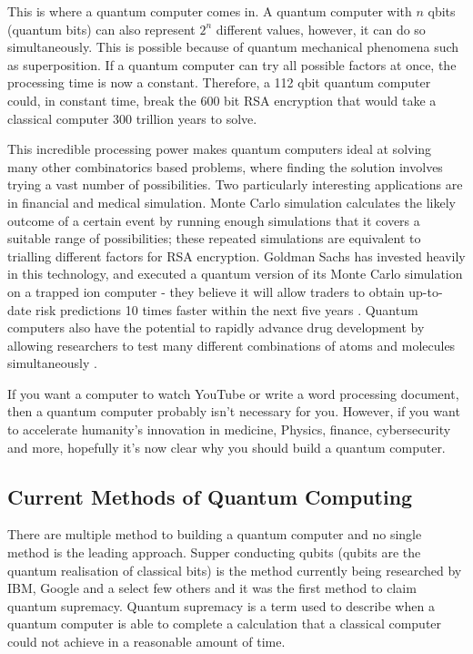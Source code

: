 This is where a quantum computer comes in. A quantum computer with $n$ qbits (quantum bits) can also represent $2^n$ different values, however, it can do so simultaneously. This is possible because of quantum mechanical phenomena such as superposition. If a quantum computer can try all possible factors at once, the processing time is now a constant. Therefore, a 112 qbit quantum computer could, in constant time, break the 600 bit RSA encryption that would take a classical computer 300 trillion years to solve.

This incredible processing power makes quantum computers ideal at solving many other combinatorics based problems, where finding the solution involves trying a vast number of possibilities. Two particularly interesting applications are in financial and medical simulation. Monte Carlo simulation calculates the likely outcome of a certain event by running enough simulations that it covers a suitable range of possibilities; these repeated simulations are equivalent to trialling different factors for RSA encryption. Goldman Sachs has invested heavily in this technology, and executed a quantum version of its Monte Carlo simulation on a trapped ion computer - they believe it will allow traders to obtain up-to-date risk predictions 10 times faster within the next five years \cite{Giurgica_Tiron_2022}. Quantum computers also have the potential to rapidly advance drug development by allowing researchers to test many different combinations of atoms and molecules simultaneously \cite{bova2021commercial}.

If you want a computer to watch YouTube or write a word processing document, then a quantum computer probably isn't necessary for you. However, if you want to accelerate humanity's innovation in medicine, Physics, finance, cybersecurity and more, hopefully it's now clear why you should build a quantum computer.

\subsection{Current Methods of Quantum Computing}
There are multiple method to building a quantum computer and no single method is the leading approach.
Supper conducting qubits (qubits are the quantum realisation of classical bits) is the method currently being researched by IBM, Google and a select few others and it was the first method to claim quantum supremacy. \cite{gibney_hello_2019}
Quantum supremacy is a term used to describe when a quantum computer is able to complete a calculation that a classical computer could not achieve in a reasonable amount of time. 

